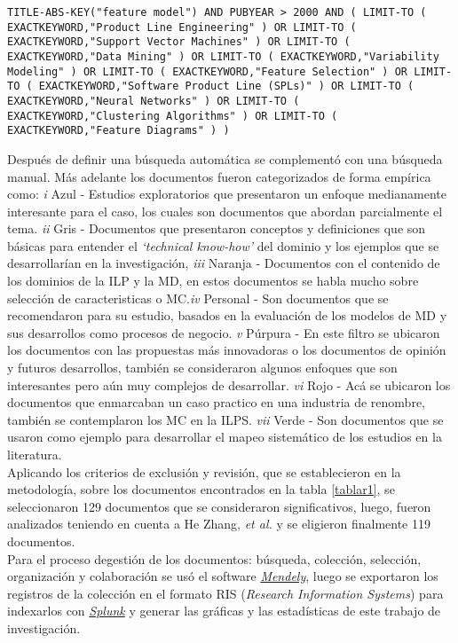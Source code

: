 \begin{defn}%
	
	\texttt{TITLE-ABS-KEY("feature model") AND PUBYEAR > 2000 AND ( LIMIT-TO ( EXACTKEYWORD,"Product Line Engineering" ) OR LIMIT-TO ( EXACTKEYWORD,"Support Vector Machines" ) OR LIMIT-TO ( EXACTKEYWORD,"Data Mining" ) OR LIMIT-TO ( EXACTKEYWORD,"Variability Modeling" ) OR LIMIT-TO ( EXACTKEYWORD,"Feature Selection" ) OR LIMIT-TO ( EXACTKEYWORD,"Software Product Line (SPLs)" ) OR LIMIT-TO ( EXACTKEYWORD,"Neural Networks" ) OR LIMIT-TO ( EXACTKEYWORD,"Clustering Algorithms" ) OR LIMIT-TO ( EXACTKEYWORD,"Feature Diagrams" ) )}
	
\end{defn}

Después de  definir una búsqueda automática se complementó con una búsqueda manual\cite{Caruana2006}.
Más adelante los documentos fueron categorizados de forma empírica como: \textit{i} Azul - Estudios exploratorios que presentaron un enfoque medianamente interesante para el caso, los cuales son documentos que abordan parcialmente el tema. \textit{ii} Gris - Documentos que presentaron conceptos y definiciones que son básicas para entender el \textit{`technical know-how'} del dominio y los ejemplos que se desarrollarían en la investigación,  \textit{iii} Naranja - Documentos con el contenido de los dominios de la ILP y la MD, en estos documentos se habla mucho sobre selección de caracteristicas o MC.\textit{iv} Personal - Son documentos que se recomendaron para su estudio,  basados en la evaluación de los modelos de MD y sus desarrollos como procesos de negocio. \textit{v} Púrpura - En este filtro se ubicaron los documentos con las propuestas más innovadoras o los documentos de opinión y futuros desarrollos, también se consideraron algunos enfoques que son interesantes pero aún muy complejos de desarrollar. \textit{vi} Rojo - Acá se ubicaron los documentos que enmarcaban un caso practico en una industria de renombre, también se contemplaron los MC en la ILPS. \textit{vii} Verde - Son documentos que se usaron como ejemplo para desarrollar el mapeo sistemático de los estudios en la literatura.\\
Aplicando los criterios de exclusión y revisión, que se establecieron en la metodología, sobre los documentos encontrados en la tabla \ref{tablar1}, se seleccionaron 129 documentos que se consideraron significativos, luego, fueron analizados teniendo en cuenta a He Zhang, \textit{et al.}\cite{Zhang2011} y  se eligieron finalmente 119 documentos.
 \\
 Para el proceso degestión de los documentos: búsqueda, colección, selección, organización y colaboración se usó el software \href{https://www.mendeley.com}{\textit{Mendely}}, luego se exportaron los registros de la colección en el formato RIS (\textit{Research Information Systems}) para indexarlos con \href{https://www.splunk.com}{\textit{Splunk}} y generar las gráficas y las estadísticas de este trabajo de investigación.
 
